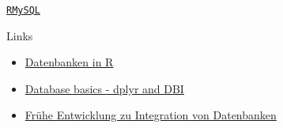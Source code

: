 \documentclass[ignorenonframetext,]{beamer}
\begin{document}
\begin{frame}{\href{https://cran.r-project.org/web/packages/RMySQL/index.html}{\texttt{RMySQL}}}

\end{frame}

\begin{frame}{Links}

\begin{itemize}
\item
  \href{https://cran.r-project.org/web/packages/dplyr/vignettes/databases.html}{Datenbanken
  in R}
\item
  \href{https://shiny.rstudio.com/articles/overview.html}{Database
  basics - dplyr and DBI}
\item
  \href{https://cran.r-project.org/web/packages/DBI/vignettes/DBI-proposal.html}{Frühe
  Entwicklung zu Integration von Datenbanken}
\end{itemize}

\end{frame}
\end{document}
